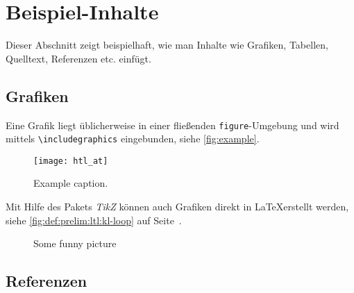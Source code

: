 



\section{Beispiel-Inhalte}
Dieser Abschnitt zeigt beispielhaft, wie man Inhalte wie Grafiken, Tabellen, Quelltext, Referenzen etc. einfügt. 

\subsection{Grafiken}
Eine Grafik liegt üblicherweise in einer fließenden \texttt{figure}-Umgebung und wird mittels \verb+\includegraphics+ eingebunden, siehe \autoref{fig:example}.

\begin{figure}
	\centering
	\texttt{[image: htl\_at]}
	\caption{Example caption.}
	\label{fig:example}
\end{figure}

Mit Hilfe des Pakets \emph{TikZ} können auch Grafiken direkt in \LaTeX erstellt werden, siehe \zB \autoref{fig:def:prelim:ltl:kl-loop} auf Seite~\pageref{fig:def:prelim:ltl:kl-loop}.

\begin{figure}
  \centering
  \caption{Some funny picture}
  \label{fig:def:prelim:ltl:kl-loop}
\end{figure}

\subsection{Referenzen}

